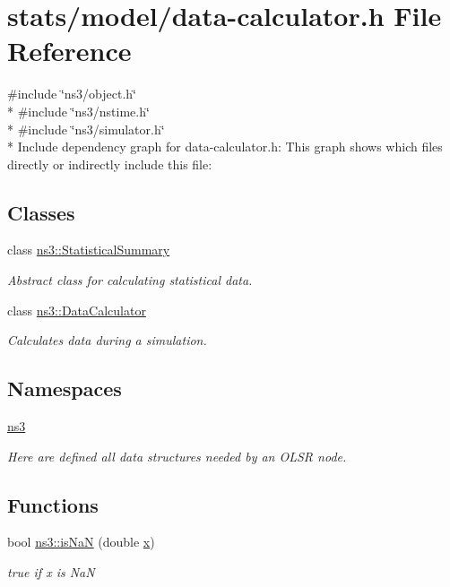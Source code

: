 \hypertarget{data-calculator_8h}{}\section{stats/model/data-\/calculator.h File Reference}
\label{data-calculator_8h}
{\ttfamily \#include \char`\"{}ns3/object.\+h\char`\"{}}\\*
{\ttfamily \#include \char`\"{}ns3/nstime.\+h\char`\"{}}\\*
{\ttfamily \#include \char`\"{}ns3/simulator.\+h\char`\"{}}\\*
Include dependency graph for data-\/calculator.h\+:
This graph shows which files directly or indirectly include this file\+:
\subsection*{Classes}
\begin{DoxyCompactItemize}
\item 
class \hyperlink{classns3_1_1StatisticalSummary}{ns3\+::\+Statistical\+Summary}
\begin{DoxyCompactList}\small\item\em Abstract class for calculating statistical data. \end{DoxyCompactList}\item 
class \hyperlink{classns3_1_1DataCalculator}{ns3\+::\+Data\+Calculator}
\begin{DoxyCompactList}\small\item\em Calculates data during a simulation. \end{DoxyCompactList}\end{DoxyCompactItemize}
\subsection*{Namespaces}
\begin{DoxyCompactItemize}
\item 
 \hyperlink{namespacens3}{ns3}
\begin{DoxyCompactList}\small\item\em Here are defined all data structures needed by an O\+L\+SR node. \end{DoxyCompactList}\end{DoxyCompactItemize}
\subsection*{Functions}
\begin{DoxyCompactItemize}
\item 
bool \hyperlink{namespacens3_af0d87e9b87c0909d914f4369e0bfaa0b}{ns3\+::is\+NaN} (double \hyperlink{lte__link__budget__x2__handover__measures_8m_a9336ebf25087d91c818ee6e9ec29f8c1}{x})
\begin{DoxyCompactList}\small\item\em true if x is NaN \end{DoxyCompactList}\end{DoxyCompactItemize}
